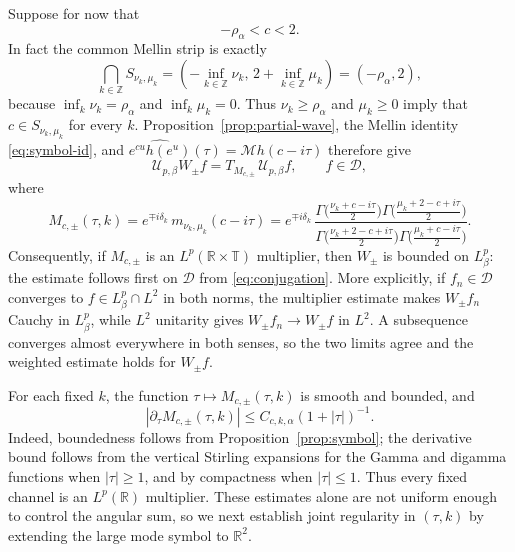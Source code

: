 \documentclass[11pt,a4paper,reqno,backref=page]{amsart}
\newcommand{\R}{\mathbb R}
\newcommand{\Z}{\mathbb Z}
\newcommand{\T}{\mathbb T}
\newcommand{\Mell}{\mathcal M}               %
\numberwithin{equation}{section}
\theoremstyle{definition}
\theoremstyle{remark}
\begin{document}
Suppose for now that
\begin{equation}\label{eq:c-strip}
  -\rho_\alpha<c<2.
\end{equation}
In fact the common Mellin strip is exactly
\begin{equation}\label{eq:common-strip}
  \bigcap_{k\in\Z}S_{\nu_k,\mu_k}
  =\left(-\inf_{k\in\Z}\nu_k,\,2+\inf_{k\in\Z}\mu_k\right)
  =(-\rho_\alpha,2),
\end{equation}
because $\inf_k\nu_k=\rho_\alpha$ and $\inf_k\mu_k=0$. Thus
$\nu_k\ge\rho_\alpha$ and $\mu_k\ge0$ imply that $c\in
S_{\nu_k,\mu_k}$ for every $k$.
Proposition~\ref{prop:partial-wave}, the Mellin identity
\eqref{eq:symbol-id}, and $\widehat{e^{cu}h(e^u)}(\tau)=\Mell
h(c-i\tau)$ therefore give
\begin{equation}\label{eq:conjugation}
  \mathcal U_{p,\beta}W_\pm f=T_{M_{c,\pm}}\,\mathcal
  U_{p,\beta}f,
  \qquad f\in\mathcal D,
\end{equation}
where
\begin{equation}\label{eq:joint-mult}
  M_{c,\pm}(\tau,k)=e^{\mp i\delta_k}\,m_{\nu_k,\mu_k}(c-i\tau)
  =e^{\mp i\delta_k}\,
  \frac{\Gamma\bigl(\frac{\nu_k+c-i\tau}{2}\bigr)
    \Gamma\bigl(\frac{\mu_k+2-c+i\tau}{2}\bigr)}
  {\Gamma\bigl(\frac{\nu_k+2-c+i\tau}{2}\bigr)
    \Gamma\bigl(\frac{\mu_k+c-i\tau}{2}\bigr)}.
\end{equation}
Consequently, if $M_{c,\pm}$ is an $L^p(\R\times\T)$ multiplier,
then $W_\pm$ is bounded on $L^p_\beta$: the estimate follows
first on $\mathcal D$ from \eqref{eq:conjugation}. More
explicitly, if $f_n\in\mathcal D$ converges to $f\in
L^p_\beta\cap L^2$ in both norms, the multiplier estimate makes
$W_\pm f_n$ Cauchy in $L^p_\beta$, while $L^2$ unitarity gives
$W_\pm f_n\to W_\pm f$ in $L^2$. A subsequence converges almost
everywhere in both senses, so the two limits agree and the
weighted estimate holds for $W_\pm f$.

For each fixed $k$, the function $\tau\mapsto M_{c,\pm}(\tau,k)$
is smooth and bounded, and
\begin{equation}\label{eq:fixed-mode-mikhlin}
  |\partial_\tau M_{c,\pm}(\tau,k)|
  \le C_{c,k,\alpha}(1+|\tau|)^{-1}.
\end{equation}
Indeed, boundedness follows from Proposition~\ref{prop:symbol};
the derivative bound follows from the vertical Stirling
expansions for the Gamma and digamma functions when
$|\tau|\ge1$, and by compactness when $|\tau|\le1$. Thus every
fixed channel is an $L^p(\R)$ multiplier. These estimates alone
are not uniform enough to control the angular sum, so we next
establish joint regularity in $(\tau,k)$ by extending the large
mode symbol to $\R^2$.
\end{document}
